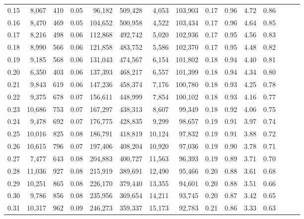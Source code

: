 \begin{tabular}{rrrrrrrrrrrrrrr}
0.15 &   8,067 &    410 &  0.05 &   96,182 &  509,428 &    4,053 &  103,903 &  0.17 &  0.96 &  4.72 &      0.86 \\
0.16 &   8,470 &    469 &  0.05 &  104,652 &  500,958 &    4,522 &  103,434 &  0.17 &  0.96 &  4.64 &      0.85 \\
0.17 &   8,216 &    498 &  0.06 &  112,868 &  492,742 &    5,020 &  102,936 &  0.17 &  0.95 &  4.56 &      0.83 \\
0.18 &   8,990 &    566 &  0.06 &  121,858 &  483,752 &    5,586 &  102,370 &  0.17 &  0.95 &  4.48 &      0.82 \\
0.19 &   9,185 &    568 &  0.06 &  131,043 &  474,567 &    6,154 &  101,802 &  0.18 &  0.94 &  4.40 &      0.81 \\
0.20 &   6,350 &    403 &  0.06 &  137,393 &  468,217 &    6,557 &  101,399 &  0.18 &  0.94 &  4.34 &      0.80 \\
0.21 &   9,843 &    619 &  0.06 &  147,236 &  458,374 &    7,176 &  100,780 &  0.18 &  0.93 &  4.25 &      0.78 \\
0.22 &   9,375 &    678 &  0.07 &  156,611 &  448,999 &    7,854 &  100,102 &  0.18 &  0.93 &  4.16 &      0.77 \\
0.23 &  10,686 &    753 &  0.07 &  167,297 &  438,313 &    8,607 &   99,349 &  0.18 &  0.92 &  4.06 &      0.75 \\
0.24 &   9,478 &    692 &  0.07 &  176,775 &  428,835 &    9,299 &   98,657 &  0.19 &  0.91 &  3.97 &      0.74 \\
0.25 &  10,016 &    825 &  0.08 &  186,791 &  418,819 &   10,124 &   97,832 &  0.19 &  0.91 &  3.88 &      0.72 \\
0.26 &  10,615 &    796 &  0.07 &  197,406 &  408,204 &   10,920 &   97,036 &  0.19 &  0.90 &  3.78 &      0.71 \\
0.27 &   7,477 &    643 &  0.08 &  204,883 &  400,727 &   11,563 &   96,393 &  0.19 &  0.89 &  3.71 &      0.70 \\
0.28 &  11,036 &    927 &  0.08 &  215,919 &  389,691 &   12,490 &   95,466 &  0.20 &  0.88 &  3.61 &      0.68 \\
0.29 &  10,251 &    865 &  0.08 &  226,170 &  379,440 &   13,355 &   94,601 &  0.20 &  0.88 &  3.51 &      0.66 \\
0.30 &   9,786 &    856 &  0.08 &  235,956 &  369,654 &   14,211 &   93,745 &  0.20 &  0.87 &  3.42 &      0.65 \\
0.31 &  10,317 &    962 &  0.09 &  246,273 &  359,337 &   15,173 &   92,783 &  0.21 &  0.86 &  3.33 &      0.63 \\

\end{tabular}
